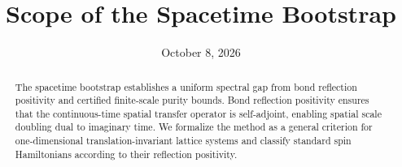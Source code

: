 \documentclass[aps,prl,reprint,amsmath,amssymb,nofootinbib,raggedbottom]{revtex4-2}
\begin{document}
\title{Scope of the Spacetime Bootstrap}
\date{October 8, 2026}
\begin{abstract}
The spacetime bootstrap establishes a uniform spectral gap from bond reflection positivity and certified finite-scale purity bounds. Bond reflection positivity ensures that the continuous-time spatial transfer operator is self-adjoint, enabling spatial scale doubling dual to imaginary time. We formalize the method as a general criterion for one-dimensional translation-invariant lattice systems and classify standard spin Hamiltonians according to their reflection positivity.
\end{abstract}
\maketitle
\setlength{\abovedisplayskip}{5pt plus 2pt minus 1pt}
\setlength{\belowdisplayskip}{5pt plus 2pt minus 1pt}

\appendix
\setcounter{secnumdepth}{2}
\setcounter{section}{3}
\end{document}
